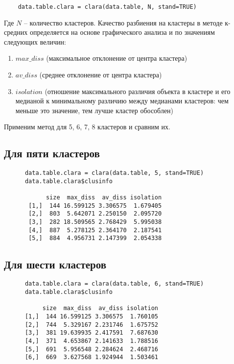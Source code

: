 \documentclass[12pt,a4paper,titlepage]{article}
\begin{document}
  \begin{lstlisting}
    data.table.clara = clara(data.table, N, stand=TRUE)
  \end{lstlisting}

  Где $N$ – количество кластеров.
  Качество разбиения на кластеры в методе к-средних определяется на основе графического анализа и по значениям следующих величин:

  \begin{enumerate}
    \item $max\_diss$ (максимальное отклонение от центра кластера)
    \item $av\_diss$ (среднее отклонение от центра кластера)
    \item $isolation$ (отношение максимального различия объекта в кластере и его медианой к минимальному различию между медианами кластеров: чем меньше это значение, тем лучше кластер обособлен)
  \end{enumerate}
  Применим метод для 5, 6, 7, 8 кластеров и сравним их.

  \subsection {Для пяти кластеров}
    \begin{lstlisting}
      data.table.clara = clara(data.table, 5, stand=TRUE)
      data.table.clara$clusinfo

            size  max_diss  av_diss isolation
       [1,]  144 16.599125 3.306575  1.679405
       [2,]  803  5.642071 2.250150  2.095720
       [3,]  282 18.509565 2.768429  5.995038
       [4,]  887  5.278125 2.364170  2.187541
       [5,]  884  4.956731 2.147399  2.054338

    \end{lstlisting}
  \subsection {Для шести кластеров}
    \begin{lstlisting}
      data.table.clara = clara(data.table, 6, stand=TRUE)
      data.table.clara$clusinfo

           size  max_diss  av_diss isolation
      [1,]  144 16.599125 3.306575  1.760105
      [2,]  744  5.329167 2.231746  1.675752
      [3,]  381 19.639935 2.417591  7.687630
      [4,]  371  4.653867 2.141633  1.788516
      [5,]  691  5.956548 2.284624  2.468716
      [6,]  669  3.627568 1.924944  1.503461
    \end{lstlisting}
\end{document}
